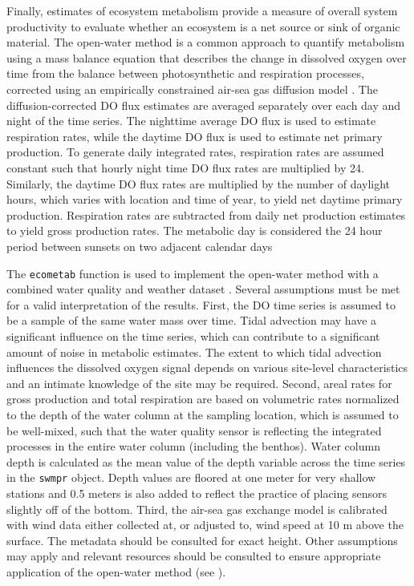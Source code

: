 \documentclass[10pt,letterpaper]{article}\usepackage[]{graphicx}\usepackage[]{color}
\begin{document}
Finally, estimates of ecosystem metabolism provide a measure of overall system productivity to evaluate whether an ecosystem is a net source or sink of organic material.  The open-water method \cite{Odum56} is a common approach to quantify metabolism using a mass balance equation that describes the change in dissolved oxygen over time from the balance between photosynthetic and respiration processes, corrected using an empirically constrained air-sea gas diffusion model \cite{Ro06,Thebault08}. The diffusion-corrected \gls{DO} flux estimates are averaged separately over each day and night of the time series. The nighttime average \gls{DO} flux is used to estimate respiration rates, while the daytime \gls{DO} flux is used to estimate net primary production. To generate daily integrated rates, respiration rates are assumed constant such that hourly night time \gls{DO} flux rates are multiplied by 24. Similarly, the daytime \gls{DO} flux rates are multiplied by the number of daylight hours, which varies with location and time of year, to yield net daytime primary production. Respiration rates are subtracted from daily net production estimates to yield gross production rates. The metabolic day is considered the 24 hour period between sunsets on two adjacent calendar days  

The \texttt{ecometab} function is used to implement the open-water method with a combined water quality and weather dataset \cite{Caffrey14}.  Several assumptions must be met for a valid interpretation of the results.  First, the \gls{DO} time series is assumed to be a sample of the same water mass over time.  Tidal advection may have a significant influence on the time series, which can contribute to a significant amount of noise in metabolic estimates.  The extent to which tidal advection influences the dissolved oxygen signal depends on various site-level characteristics and an intimate knowledge of the site may be required.  Second, areal rates for gross production and total respiration are based on volumetric rates normalized to the depth of the water column at the sampling location, which is assumed to be well-mixed, such that the water quality sensor is reflecting the integrated processes in the entire water column (including the benthos).  Water column depth is calculated as the mean value of the depth variable across the time series in the \texttt{swmpr} object. Depth values are floored at one meter for very shallow stations and 0.5 meters is also added to reflect the practice of placing sensors slightly off of the bottom.  Third, the air-sea gas exchange model is calibrated with wind data either collected at, or adjusted to, wind speed at 10 m above the surface.  The metadata should be consulted for exact height. Other assumptions may apply and relevant resources should be consulted to ensure appropriate application of the open-water method (see \cite{Kemp12,Needoba12}).
\end{document}
